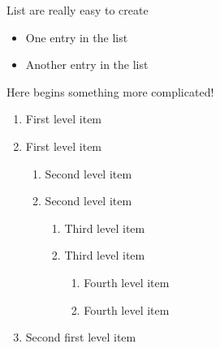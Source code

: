 \documentclass{article}
\begin{document}
List are really easy to create
\begin{itemize}
  \item One entry in the list
  \item Another entry in the list
\end{itemize}

Here begins something more complicated!
 \begin{enumerate}
   \item First level item
   \item First level item
   \begin{enumerate}
     \item Second level item
     \item Second level item
     \begin{enumerate}
       \item Third level item
       \item Third level item
       \begin{enumerate}
         \item Fourth level item
         \item Fourth level item
       \end{enumerate}
     \end{enumerate}
   \end{enumerate}
   \item Second first level item
 \end{enumerate}
 
 
\end{document}
